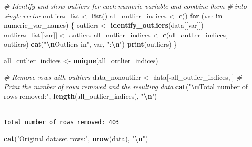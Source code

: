 \documentclass[
  10pt,
  paper=a4,
  ,captions=tableheading
]{scrartcl}
\newenvironment{Shaded}{\begin{snugshade}}{\end{snugshade}}
\newcommand{\CommentTok}[1]{\textcolor[rgb]{0.56,0.35,0.01}{\textit{#1}}}
\newcommand{\ControlFlowTok}[1]{\textcolor[rgb]{0.13,0.29,0.53}{\textbf{#1}}}
\newcommand{\FunctionTok}[1]{\textcolor[rgb]{0.13,0.29,0.53}{\textbf{#1}}}
\newcommand{\NormalTok}[1]{#1}
\newcommand{\OtherTok}[1]{\textcolor[rgb]{0.56,0.35,0.01}{#1}}
\newcommand{\SpecialCharTok}[1]{\textcolor[rgb]{0.81,0.36,0.00}{\textbf{#1}}}
\newcommand{\StringTok}[1]{\textcolor[rgb]{0.31,0.60,0.02}{#1}}
\begin{document}
\begin{Shaded}
\begin{Highlighting}[]
\CommentTok{\# Identify and show outliers for each numeric variable and combine them}
\CommentTok{\# into single vector}
\NormalTok{outliers\_list }\OtherTok{\textless{}{-}} \FunctionTok{list}\NormalTok{()}
\NormalTok{all\_outlier\_indices }\OtherTok{\textless{}{-}} \FunctionTok{c}\NormalTok{()}
\ControlFlowTok{for}\NormalTok{ (var }\ControlFlowTok{in}\NormalTok{ numeric\_var\_names) \{}
\NormalTok{    outliers }\OtherTok{\textless{}{-}} \FunctionTok{identify\_outliers}\NormalTok{(data[[var]])}
\NormalTok{    outliers\_list[[var]] }\OtherTok{\textless{}{-}}\NormalTok{ outliers}
\NormalTok{    all\_outlier\_indices }\OtherTok{\textless{}{-}} \FunctionTok{c}\NormalTok{(all\_outlier\_indices, outliers)}
    \FunctionTok{cat}\NormalTok{(}\StringTok{"}\SpecialCharTok{\textbackslash{}n}\StringTok{Outliers in"}\NormalTok{, var, }\StringTok{":}\SpecialCharTok{\textbackslash{}n}\StringTok{"}\NormalTok{)}
    \FunctionTok{print}\NormalTok{(outliers)}
\NormalTok{\}}

\NormalTok{all\_outlier\_indices }\OtherTok{\textless{}{-}} \FunctionTok{unique}\NormalTok{(all\_outlier\_indices)}
\end{Highlighting}
\end{Shaded}

\small

\small

\begin{Shaded}
\begin{Highlighting}[]
\CommentTok{\# Remove rows with outliers}
\NormalTok{data\_nonoutlier }\OtherTok{\textless{}{-}}\NormalTok{ data[}\SpecialCharTok{{-}}\NormalTok{all\_outlier\_indices, ]}
\CommentTok{\# Print the number of rows removed and the resulting data}
\FunctionTok{cat}\NormalTok{(}\StringTok{"}\SpecialCharTok{\textbackslash{}n}\StringTok{Total number of rows removed:"}\NormalTok{, }\FunctionTok{length}\NormalTok{(all\_outlier\_indices), }\StringTok{"}\SpecialCharTok{\textbackslash{}n}\StringTok{"}\NormalTok{)}
\end{Highlighting}
\end{Shaded}

\begin{verbatim}

Total number of rows removed: 403 
\end{verbatim}

\begin{Shaded}
\begin{Highlighting}[]
\FunctionTok{cat}\NormalTok{(}\StringTok{"Original dataset rows:"}\NormalTok{, }\FunctionTok{nrow}\NormalTok{(data), }\StringTok{"}\SpecialCharTok{\textbackslash{}n}\StringTok{"}\NormalTok{)}
\end{Highlighting}
\end{Shaded}
\end{document}
